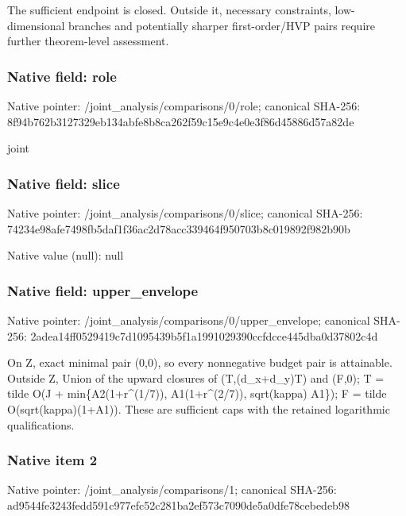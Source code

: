 \documentclass[10pt,a4paper]{article}
\begin{document}
\begingroup\raggedright\sloppy The sufficient endpoint is closed. Outside it,\allowbreak{} necessary constraints,\allowbreak{} low-dimensional branches and potentially sharper first-order/\allowbreak{}HVP pairs require further theorem-level assessment.\par\endgroup

\subsubsection{Native field: role}
Native pointer: /joint\_\allowbreak{}analysis/comparisons/0/role; canonical SHA-256: 8f94b762b3127329eb134abfe8b8ca262f59c15e9c4e0e3f86d45886d57a82de

\begingroup\raggedright\sloppy joint\par\endgroup

\subsubsection{Native field: slice}
Native pointer: /joint\_\allowbreak{}analysis/comparisons/0/slice; canonical SHA-256: 74234e98afe7498fb5daf1f36ac2d78acc339464f950703b8c019892f982b90b

Native value (null): null

\subsubsection{Native field: upper\_\allowbreak{}envelope}
Native pointer: /joint\_\allowbreak{}analysis/comparisons/0/upper\_\allowbreak{}envelope; canonical SHA-256: 2adea14ff0529419c7d1095439b5f1a1991029390ccfdcce445dba0d37802c4d

\begingroup\raggedright\sloppy On Z,\allowbreak{} exact minimal pair (0,\allowbreak{}0),\allowbreak{} so every nonnegative budget pair is attainable. Outside Z,\allowbreak{} Union of the upward closures of (T,\allowbreak{}(d\_\allowbreak{}x+d\_\allowbreak{}y)T) and (F,\allowbreak{}0);\allowbreak{} T =\allowbreak{} tilde O(J + min\{A2(1+r\textasciicircum{}(1/\allowbreak{}7)),\allowbreak{} A1(1+r\textasciicircum{}(2/\allowbreak{}7)),\allowbreak{} sqrt(kappa) A1\});\allowbreak{} F =\allowbreak{} tilde O(sqrt(kappa)(1+A1)). These are sufficient caps with the retained logarithmic qualifications.\par\endgroup

\subsubsection{Native item 2}
Native pointer: /joint\_\allowbreak{}analysis/comparisons/1; canonical SHA-256: ad9544fe3243fedd591c977efc52c281ba2ef573c7090de5a0dfe78cebedeb98
\end{document}
